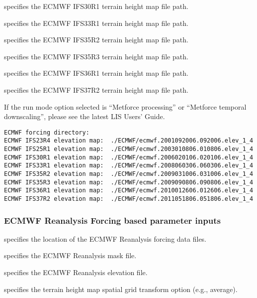   specifies the ECMWF IFS30R1 
 terrain height map file path.

  specifies the ECMWF IFS33R1 
 terrain height map file path.

  specifies the ECMWF IFS35R2
 terrain height map file path.

  specifies the ECMWF IFS35R3
 terrain height map file path.

  specifies the ECMWF IFS36R1
 terrain height map file path.

  specifies the ECMWF IFS37R2
 terrain height map file path.


 If the run mode option selected is ``Metforce processing'' or
 ``Metforce temporal downscaling'', please see the latest LIS Users'
 Guide.

 

 \begin{Verbatim}[frame=single]
ECMWF forcing directory:
ECMWF IFS23R4 elevation map:  ./ECMWF/ecmwf.2001092006.092006.elev_1_4
ECMWF IFS25R1 elevation map:  ./ECMWF/ecmwf.2003010806.010806.elev_1_4
ECMWF IFS30R1 elevation map:  ./ECMWF/ecmwf.2006020106.020106.elev_1_4
ECMWF IFS33R1 elevation map:  ./ECMWF/ecmwf.2008060306.060306.elev_1_4
ECMWF IFS35R2 elevation map:  ./ECMWF/ecmwf.2009031006.031006.elev_1_4
ECMWF IFS35R3 elevation map:  ./ECMWF/ecmwf.2009090806.090806.elev_1_4
ECMWF IFS36R1 elevation map:  ./ECMWF/ecmwf.2010012606.012606.elev_1_4
ECMWF IFS37R2 elevation map:  ./ECMWF/ecmwf.2011051806.051806.elev_1_4
 \end{Verbatim}

 
 \subsubsection{ECMWF Reanalysis Forcing based parameter inputs}

  specifies the
 location of the ECMWF Reanalysis forcing data files.

  specifies the ECMWF Reanalysis
 mask file.

  specifies the ECMWF Reanalysis  
 elevation file.  

  specifies 
  the terrain height map spatial grid transform option (e.g., average).

